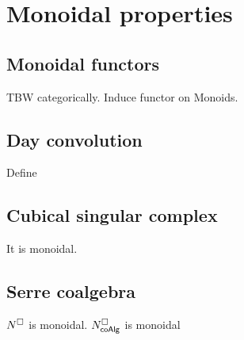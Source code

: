 
\section{Monoidal properties}

\subsection{Monoidal functors}

TBW categorically. Induce functor on Monoids.

\subsection{Day convolution}

Define

\subsection{Cubical singular complex}

It is monoidal.



\subsection{Serre coalgebra}

$N^{\square}$ is monoidal. $N^{\square}_{\mathsf{coAlg}}$ is monoidal


